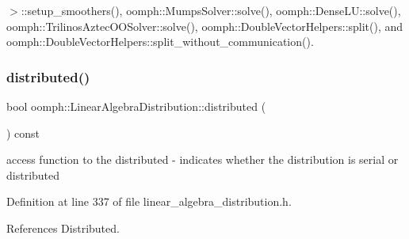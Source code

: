$>$\+::setup\+\_\+smoothers(), oomph\+::\+Mumps\+Solver\+::solve(), oomph\+::\+Dense\+L\+U\+::solve(), oomph\+::\+Trilinos\+Aztec\+O\+O\+Solver\+::solve(), oomph\+::\+Double\+Vector\+Helpers\+::split(), and oomph\+::\+Double\+Vector\+Helpers\+::split\+\_\+without\+\_\+communication().

\mbox{\label{classoomph_1_1LinearAlgebraDistribution_a05842d032d28880ae37951deae804ad8}} 
\subsubsection{\texorpdfstring{distributed()}{distributed()}}
{\footnotesize\ttfamily bool oomph\+::\+Linear\+Algebra\+Distribution\+::distributed (\begin{DoxyParamCaption}{ }\end{DoxyParamCaption}) const\hspace{0.3cm}{\ttfamily [inline]}}



access function to the distributed -\/ indicates whether the distribution is serial or distributed 



Definition at line 337 of file linear\+\_\+algebra\+\_\+distribution.\+h.



References Distributed.



